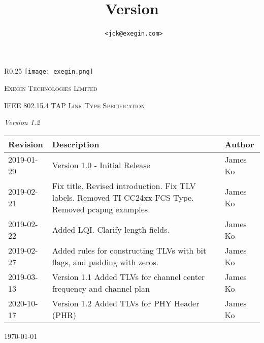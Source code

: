 \documentclass[12pt]{article}
\title{
\maintitle
\\\company
\\\hfill\\\normalsize Version \versionnumber
}
\author{\authorname~\tt{<jck@exegin.com>}}
\newcommand\versionnumber{1.2}
\renewcommand\_{\textunderscore\allowbreak}
\begin{document}
\begin{titlepage}
    \vspace{5cm}
    \begin{wrapfigure}{R}{0.25\textwidth}
        \texttt{[image: exegin.png]}
    \end{wrapfigure}
    \vspace{2cm}
    {\scshape\LARGE Exegin Technologies Limited \par}
    \vspace{5cm}
    {\scshape\Large IEEE 802.15.4 TAP Link Type Specification\par}
    {\itshape Version \versionnumber}
    \vspace{2cm}
    \vfill

    \vfill

    \begin{tabular}{|p{2cm}|p{11.5cm}| p{3cm}|}
\hline
    \textbf{Revision} & \textbf{Description} & \textbf{Author}\\
\hline
    2019-01-29 & Version 1.0 - Initial Release & James Ko\\
\hline
    2019-02-21 & Fix title. Revised introduction. Fix TLV labels.
    Removed TI CC24xx FCS Type. Removed pcapng examples. & James Ko\\
\hline
    2019-02-22 & Added LQI. Clarify length fields. & James Ko\\
\hline
    2019-02-27 & Added rules for constructing TLVs with bit flags, and padding
        with zeros.  & James Ko\\
\hline
    2019-03-13 & Version 1.1 Added TLVs for channel center frequency and
        channel plan & James Ko\\ \hline
\hline
    2020-10-17 & Version 1.2 Added TLVs for PHY Header (PHR) & James Ko\\
\hline
\end{tabular}

    {\large \today\par}
\end{titlepage}

\newpage
\tableofcontents

\newpage
\end{document}
